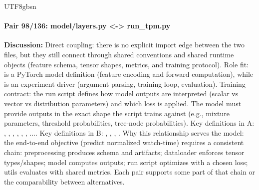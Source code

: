 \documentclass[11pt]{article}
\begin{document}
\begin{CJK*}{UTF8}{gbsn}
\paragraph{Pair 98/136: model/layers.py <-> run\_tpm.py}
\textbf{Discussion:} Direct coupling: there is no explicit import edge between the two files, but they still connect through shared conventions and shared runtime objects (feature schema, tensor shapes, metrics, and training protocol). Role fit: \texttt{} is a PyTorch model definition (feature encoding and forward computation), while \texttt{} is an experiment driver (argument parsing, training loop, evaluation). Training contract: the run script defines how model outputs are interpreted (scalar vs vector vs distribution parameters) and which loss is applied. The model must provide outputs in the exact shape the script trains against (e.g., mixture parameters, threshold probabilities, tree-node probabilities). Key definitions in A: \texttt{}, \texttt{}, \texttt{}, \texttt{}, \texttt{}, \texttt{}, .... Key definitions in B: \texttt{}, \texttt{}, \texttt{}, \texttt{}. Why this relationship serves the model: the end-to-end objective (predict normalized watch-time) requires a consistent chain: preprocessing produces schema and artifacts; dataloader enforces tensor types/shapes; model computes outputs; run script optimizes with a chosen loss; utils evaluates with shared metrics. Each pair supports some part of that chain or the comparability between alternatives.


\end{CJK*}
\end{document}

